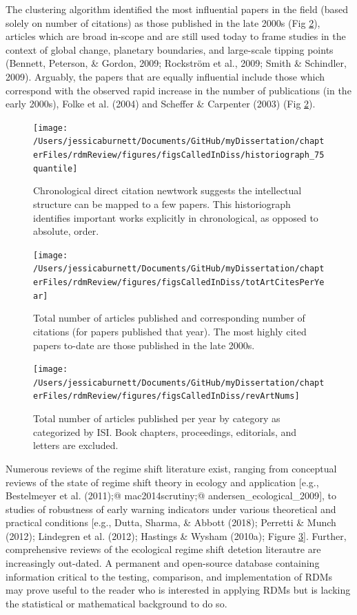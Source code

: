 \documentclass[12pt,twoside,openany]{reedthesis}
\begin{document}
The clustering algorithm identified the most influential papers in the field (based solely on number of citations) as those published in the late 2000s (Fig \ref{fig:totArtCitesPerYear}), articles which are broad in-scope and are still used today to frame studies in the context of global change, planetary boundaries, and large-scale tipping points (Bennett, Peterson, \& Gordon, 2009; Rockström et al., 2009; Smith \& Schindler, 2009). Arguably, the papers that are equally influential include those which correspond with the observed rapid increase in the number of publications (in the early 2000s), Folke et al. (2004) and Scheffer \& Carpenter (2003) (Fig \ref{fig:totArtCitesPerYear}).
\begin{figure}
\texttt{[image: /Users/jessicaburnett/Documents/GitHub/myDissertation/chapterFiles/rdmReview/figures/figsCalledInDiss/historiograph\_75quantile]} \caption{Chronological direct citation newtwork suggests the intellectual structure can be mapped to a few papers. This historiograph identifies important works explicitly in chronological, as opposed to absolute, order.}\label{fig:historiograph}
\end{figure}
\begin{figure}
\texttt{[image: /Users/jessicaburnett/Documents/GitHub/myDissertation/chapterFiles/rdmReview/figures/figsCalledInDiss/totArtCitesPerYear]} \caption{Total number of articles published and corresponding number of citations (for papers published that year). The most highly cited papers to-date are those published in the late 2000s.}\label{fig:totArtCitesPerYear}
\end{figure}
\begin{figure}
\texttt{[image: /Users/jessicaburnett/Documents/GitHub/myDissertation/chapterFiles/rdmReview/figures/figsCalledInDiss/revArtNums]} \caption{Total number of articles published per year by category as categorized by ISI. Book chapters, proceedings, editorials, and letters are excluded.}\label{fig:revArtNums}
\end{figure}
Numerous reviews of the regime shift literature exist, ranging from conceptual reviews of the state of regime shift theory in ecology and application {[}e.g., Bestelmeyer et al. (2011);@ mac2014scrutiny;@ andersen\_ecological\_2009{]}, to studies of robustness of early warning indicators under various theoretical and practical conditions {[}e.g., Dutta, Sharma, \& Abbott (2018); Perretti \& Munch (2012); Lindegren et al. (2012); Hastings \& Wysham (2010a); Figure \ref{fig:revArtNums}{]}. Further, comprehensive reviews of the ecological regime shift detetion literautre are increasingly out-dated. A permanent and open-source database containing information critical to the testing, comparison, and implementation of RDMs may prove useful to the reader who is interested in applying RDMs but is lacking the statistical or mathematical background to do so.
\end{document}
